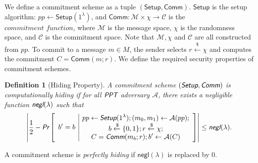 \documentclass{article}
\newtheorem{definition}{Definition}[section]
\begin{document}
We define a commitment scheme as a tuple $(\textsf{Setup}, \textsf{Comm})$. $\textsf{Setup}$ is the setup algorithm: $pp\leftarrow\textsf{Setup}(1^{\lambda})$, and $\textsf{Comm}:\mathcal{M}\times{\chi}\rightarrow\mathcal{C}$ is the $\textit{commitment function}$, where $\mathcal{M}$ is the message space, $\chi$ is the randomness space, and $\mathcal{C}$ is the commitment space. Note that $\mathcal{M}, \chi$ and $\mathcal{C}$ are all constructed from $pp$.
To commit to a message $m \in M$, the sender selects $r\xleftarrow{\$}\chi$ and computes the commitment $C = \textsf{Comm}(m; r)$. We define the required security properties of commitment schemes.

\begin{definition}[Hiding Property]
A commitment scheme $(\emph{\textsf{Setup}}, \emph{\textsf{Comm}})$ is computationally hiding if for all $\emph{\textsf{PPT}}$ adversary $\mathcal{A}$, there exists a negligible function $\emph{\textsf{negl}}(\lambda)$ such that
\begin{align*}
\left| \frac{1}{2} - \emph{\textsf{Pr}}\left[
\begin{array}{c|c}
    \begin{gathered}
        b' = b
    \end{gathered}
    &
    \begin{gathered}
        pp\leftarrow\emph{\textsf{Setup}}(1^{\lambda}); (m_0, m_1)\leftarrow\mathcal{A}(pp); \\
        b\xleftarrow{\$}\{0,1\}; r \xleftarrow{\$}\chi; \\
        C = \emph{\textsf{Comm}}(m_b; r); b'\leftarrow\mathcal{A}(C)
    \end{gathered}
\end{array}
\right]\right|
\le \emph{\textsf{negl}}(\lambda).
\end{align*}
\end{definition}
A commitment scheme is \textit{perfectly hiding} if $\textsf{negl}(\lambda)$ is replaced by $0$.
\end{document}
